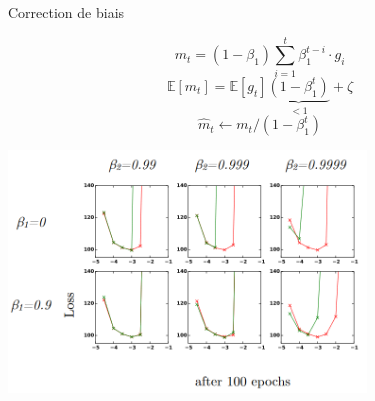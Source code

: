 \documentclass[11pt,aspectratio=169,xcolor=dvipsnames, french]{beamer}
\begin{document}
% 
% 
% 
% 
%  
% 
% 
%  
%  
% 
% 
% 
% 
%  
% 
% 

\begin{frame}{Correction de biais}
	\begin{minipage}[c]{.3\linewidth}
	$$m_t=(1-\beta_1)\displaystyle\sum_{i=1}^t\beta_1^{t-i}\cdotp g_i$$
$$\mathbb E[m_t]
= \mathbb E[g_t]\underset{<1}{\underbrace{(1-\beta_1^t)}}+\zeta$$
$$\widehat m_t \longleftarrow m_t/(1-\beta_1^t)$$
	\end{minipage} \hfill
	\begin{minipage}[c]{.65\linewidth}
\includegraphics[width=9.5cm]{../Images/bias_epochs100.png}

	\end{minipage}
\end{frame}
\end{document}
